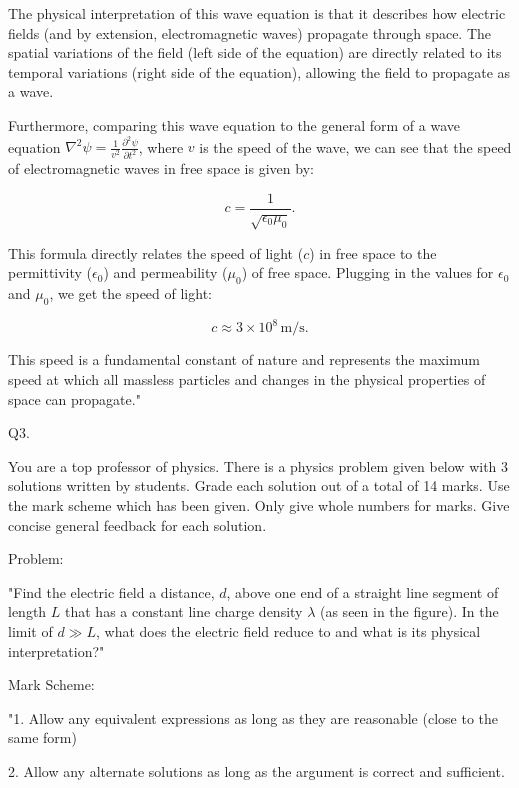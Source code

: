 The physical interpretation of this wave equation is that it describes how electric fields (and by extension, electromagnetic waves) propagate through space. The spatial variations of the field (left side of the equation) are directly related to its temporal variations (right side of the equation), allowing the field to propagate as a wave.

Furthermore, comparing this wave equation to the general form of a wave equation \(\nabla^{2}\psi = \frac{1}{v^2}\frac{\partial^2 \psi}{\partial t^{2}}\), where \(v\) is the speed of the wave, we can see that the speed of electromagnetic waves in free space is given by:

\[
c = \frac{1}{\sqrt{\epsilon_0\mu_0}}.
\]

This formula directly relates the speed of light (\(c\)) in free space to the permittivity (\(\epsilon_0\)) and permeability (\(\mu_0\)) of free space. Plugging in the values for \(\epsilon_0\) and \(\mu_0\), we get the speed of light:

\[
c \approx 3 \times 10^8 \, \text{m/s}.
\]

This speed is a fundamental constant of nature and represents the maximum speed at which all massless particles and changes in the physical properties of space can propagate."



                           Q3. 

You are a top professor of physics. There is a physics problem given below with 3 solutions written by students. Grade each solution out of a total of 14 marks. Use the mark scheme which has been given. Only give whole numbers for marks. Give concise general feedback for each solution. 

Problem:

"Find the electric field a distance, \( d \), above one end of a straight line segment of length \( L \) that has a constant line charge density \( \lambda \) (as seen in the figure). In the limit of \( d \gg L \), what does the electric field reduce to and what is its physical interpretation?"

Mark Scheme:

"1. Allow any equivalent expressions as long as they are reasonable (close to the same form)

2. Allow any alternate solutions as long as the argument is correct and sufficient. 

